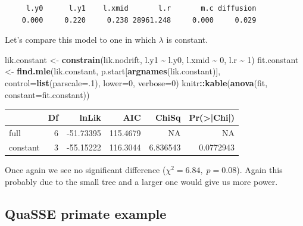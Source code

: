 \documentclass[
]{book}
\newenvironment{Shaded}{\begin{snugshade}}{\end{snugshade}}
\newcommand{\DataTypeTok}[1]{\textcolor[rgb]{0.13,0.29,0.53}{#1}}
\newcommand{\DecValTok}[1]{\textcolor[rgb]{0.00,0.00,0.81}{#1}}
\newcommand{\KeywordTok}[1]{\textcolor[rgb]{0.13,0.29,0.53}{\textbf{#1}}}
\newcommand{\NormalTok}[1]{#1}
\newcommand{\OperatorTok}[1]{\textcolor[rgb]{0.81,0.36,0.00}{\textbf{#1}}}
\newcommand{\StringTok}[1]{\textcolor[rgb]{0.31,0.60,0.02}{#1}}
\begin{document}
\begin{verbatim}
     l.y0      l.y1    l.xmid       l.r       m.c diffusion 
    0.000     0.220     0.238 28961.248     0.000     0.029 
\end{verbatim}

Let's compare this model to one in which \(\lambda\) is constant.

\begin{Shaded}
\begin{Highlighting}[]
\NormalTok{lik.constant \textless{}{-}}\StringTok{ }\KeywordTok{constrain}\NormalTok{(lik.nodrift, }
\NormalTok{                          l.y1 }\OperatorTok{\textasciitilde{}}\StringTok{ }\NormalTok{l.y0, }
\NormalTok{                          l.xmid }\OperatorTok{\textasciitilde{}}\StringTok{ }\DecValTok{0}\NormalTok{, }
\NormalTok{                          l.r }\OperatorTok{\textasciitilde{}}\StringTok{ }\DecValTok{1}\NormalTok{)}
\NormalTok{fit.constant \textless{}{-}}\StringTok{ }\KeywordTok{find.mle}\NormalTok{(lik.constant, }
\NormalTok{                         p.start[}\KeywordTok{argnames}\NormalTok{(lik.constant)], }
                         \DataTypeTok{control=}\KeywordTok{list}\NormalTok{(}\DataTypeTok{parscale=}\NormalTok{.}\DecValTok{1}\NormalTok{), }
                         \DataTypeTok{lower=}\DecValTok{0}\NormalTok{, }\DataTypeTok{verbose=}\DecValTok{0}\NormalTok{)}
\NormalTok{knitr}\OperatorTok{::}\KeywordTok{kable}\NormalTok{(}\KeywordTok{anova}\NormalTok{(fit, }\DataTypeTok{constant=}\NormalTok{fit.constant))}
\end{Highlighting}
\end{Shaded}

\begin{tabular}{l|r|r|r|r|r}
\hline
  & Df & lnLik & AIC & ChiSq & Pr(>|Chi|)\\
\hline
full & 6 & -51.73395 & 115.4679 & NA & NA\\
\hline
constant & 3 & -55.15222 & 116.3044 & 6.836543 & 0.0772943\\
\hline
\end{tabular}

Once again we see no significant difference (\(\chi^{2} = 6.84, \; p = 0.08\)). Again this probably due to the small tree and a larger one would give us more power.

\hypertarget{quasse-primate-example}{%
\subsection{QuaSSE primate example}\label{quasse-primate-example}}
\end{document}
